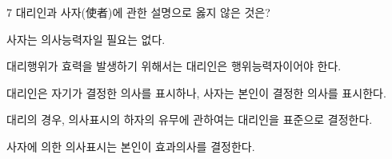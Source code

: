 \begin{question}{7}
대리인과 사자(使者)에 관한 설명으로 옳지 않은 것은?
\begin{choices}
  \item 사자는 의사능력자일 필요는 없다.
  \item 대리행위가 효력을 발생하기 위해서는 대리인은 행위능력자이어야 한다.
  \item 대리인은 자기가 결정한 의사를 표시하나, 사자는 본인이 결정한 의사를 표시한다.
  \item 대리의 경우, 의사표시의 하자의 유무에 관하여는 대리인을 표준으로 결정한다.
  \item 사자에 의한 의사표시는 본인이 효과의사를 결정한다.
\end{choices}
\end{question}
